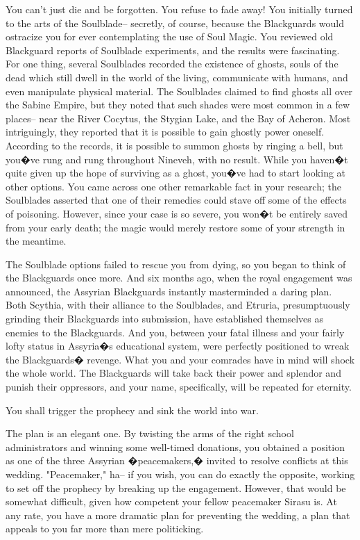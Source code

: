 \documentclass[char]{Kos}
\begin{document}
You can't just die and be forgotten. You refuse to fade away! You initially turned to the arts of the Soulblade-- secretly, of course, because the Blackguards would ostracize you for ever contemplating the use of Soul Magic. You reviewed old Blackguard reports of Soulblade experiments, and the results were fascinating. For one thing, several Soulblades recorded the existence of ghosts, souls of the dead which still dwell in the world of the living, communicate with humans, and even manipulate physical material. The Soulblades claimed to find ghosts all over the Sabine Empire, but they noted that such shades were most common in a few places-- near the River Cocytus, the Stygian Lake, and the Bay of Acheron. Most intriguingly, they reported that it is possible to gain ghostly power oneself. According to the records, it is possible to summon ghosts by ringing a bell, but you�ve rung and rung throughout Nineveh, with no result. While you haven�t quite given up the hope of surviving as a ghost, you�ve had to start looking at other options. You came across one other remarkable fact in your research; the Soulblades asserted that one of their remedies could stave off some of the effects of poisoning. However, since your case is so severe, you won�t be entirely saved from your early death; the magic would merely restore some of your strength in the meantime.

The Soulblade options failed to rescue you from dying, so you began to think of the Blackguards once more. And six months ago, when the royal engagement was announced, the Assyrian Blackguards instantly masterminded a daring plan. Both Scythia, with their alliance to the Soulblades, and Etruria, presumptuously grinding their Blackguards into submission, have established themselves as enemies to the Blackguards. And you, between your fatal illness and your fairly lofty status in Assyria�s educational system, were perfectly positioned to wreak the Blackguards� revenge. What you and your comrades have in mind will shock the whole world. The Blackguards will take back their power and splendor and punish their oppressors, and your name, specifically, will be repeated for eternity. 

You shall trigger the prophecy and sink the world into war.

The plan is an elegant one. By twisting the arms of the right school administrators and winning some well-timed donations, you obtained a position as one of the three Assyrian �peacemakers,� invited to resolve conflicts at this wedding. "Peacemaker," ha-- if you wish, you can do exactly the opposite, working to set off the prophecy by breaking up the engagement. However, that would be somewhat difficult, given how competent your fellow peacemaker Sirasu is. At any rate, you have a more dramatic plan for preventing the wedding, a plan that appeals to you far more than mere politicking.
\end{document}
